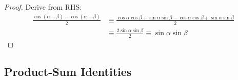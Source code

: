 \documentclass[fleqn,a4paper,11pt]{article}
\begin{document}
    \begin{proof}
    Derive from RHS:
    \begin{align*}
    \frac{\cos(\alpha - \beta) - \cos(\alpha + \beta)} 2 &\equiv
     \frac{\cos \alpha \cos \beta + \sin \alpha \sin \beta -
           \cos \alpha \cos \beta + \sin \alpha \sin \beta} 2 \\
    &\equiv \frac{2 \sin \alpha \sin \beta} 2 \equiv \sin \alpha \sin \beta
    \end{align*}
    \end{proof}

    \subsection{Product-Sum Identities} \label{sec_trig_product_sum}

\end{document}
